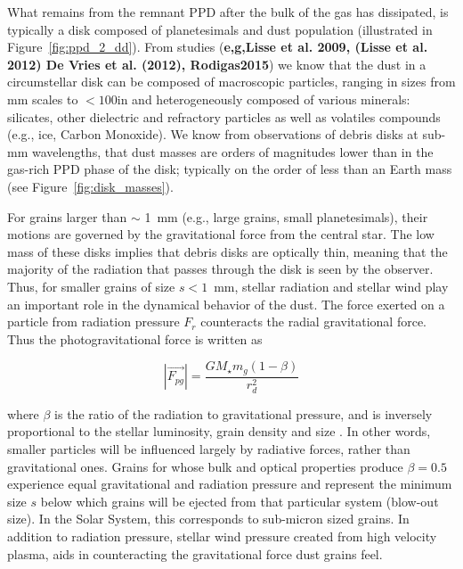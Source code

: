     What remains from the remnant PPD after the bulk of the gas has dissipated, is typically a disk composed of planetesimals and dust population (illustrated in Figure~\ref{fig:ppd_2_dd}). From studies (\textbf{e,g,Lisse	et	al.	2009, (Lisse	et	al.	2012) 	De	Vries	et	al.	(2012), Rodigas2015}) we know that the dust in a circumstellar disk can be composed of macroscopic particles, ranging in sizes from mm scales to $<100$\micron in and heterogeneously composed of various minerals: silicates, other dielectric and refractory particles as well as volatiles compounds (e.g., ice, Carbon Monoxide). We know from observations of debris disks at sub-mm wavelengths, that dust masses are orders of magnitudes lower than in the gas-rich PPD phase of the disk; typically on the order of less than an Earth mass (see Figure~\ref{fig:disk_masses}). 

    For grains larger than $\sim$ 1~mm (e.g., large grains, small planetesimals), their motions are governed by the gravitational force from the central star. 
    The low mass of these disks implies that debris disks are optically thin, meaning that the majority of the radiation that passes through the disk is seen by the observer. Thus, for smaller grains of size $s<1$~mm, stellar radiation and stellar wind play an important role in the dynamical behavior of the dust. The force exerted on a particle from radiation pressure $F_r$ counteracts the radial gravitational force. Thus the photogravitational force is written as
    
    \begin{equation}\label{eq:photograv_force}
    \left|\vec{F_{pg}}\right|= \frac{GM_\star m_g(1-\beta)}{r_d^2}
    \end{equation}
    
    \noindent where $\beta$ is the ratio of the radiation to gravitational pressure, and is inversely proportional to the stellar luminosity, grain density and size \citep{Burns1979}. In other words, smaller particles will be influenced largely by radiative forces, rather than gravitational ones. Grains for whose bulk and optical properties produce $\beta=0.5$ experience equal gravitational and radiation pressure and represent the minimum size $s$ below which grains will be ejected from that particular system (blow-out size). In the Solar System, this corresponds to sub-micron sized grains. In addition to radiation pressure, stellar wind pressure created from high velocity plasma, aids in counteracting the gravitational force dust grains feel. 
    
